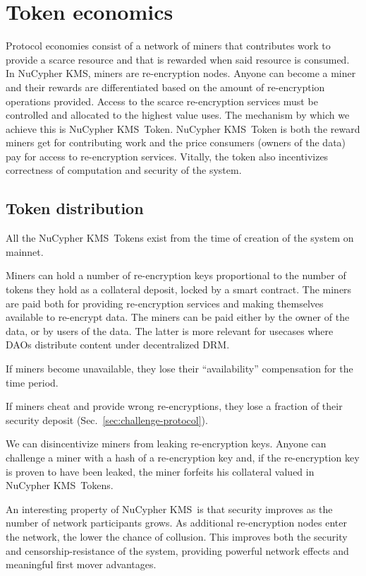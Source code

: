 \documentclass[notitlepage,longbibliography]{revtex4-1}
\newcommand{\kms}{NuCypher KMS}
\begin{document}
\section{Token economics}
\label{sec:token}

Protocol economies consist of a network of miners that contributes work to provide a scarce resource and that is
rewarded when said resource is consumed.
In \kms, miners are re-encryption nodes.
Anyone can become a miner and their rewards are differentiated based on the amount of re-encryption operations provided.
Access to the scarce re-encryption services must be controlled and allocated to the highest value uses.
The mechanism by which we achieve this is \kms~Token. \kms~Token is both the reward miners get for contributing
work and the price consumers (owners of the data) pay for access to re-encryption services.
Vitally, the token also incentivizes correctness of computation and security of the system.

\subsection{Token distribution}

All the \kms~Tokens exist from the time of creation of the system on mainnet.

Miners can hold a number of re-encryption keys proportional to the number of tokens they hold as a collateral deposit, locked by a smart contract.
The miners are paid both for providing re-encryption services and making themselves available to re-encrypt data.
The miners can be paid either by the owner of the data, or by users of the data.
The latter is more relevant for usecases where DAOs distribute content under decentralized DRM.

If miners become unavailable, they lose their ``availability'' compensation for the time period.

If miners cheat and provide wrong re-encryptions, they lose a fraction of their security deposit (Sec.~\ref{sec:challenge-protocol}).

We can disincentivize miners from leaking re-encryption keys.
Anyone can challenge a miner with a hash of a re-encryption key and, if the re-encryption key is proven to have been leaked, the miner forfeits his collateral valued in \kms~Tokens.

An interesting property of \kms~is that security improves as the number of network participants grows. As additional re-encryption
nodes enter the network, the lower the chance of collusion.
This improves both the security and censorship-resistance of the system, providing powerful network effects and meaningful first mover advantages.
\end{document}
